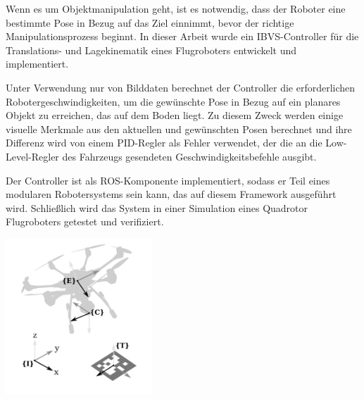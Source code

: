 
Wenn es um Objektmanipulation geht, ist es notwendig, dass der Roboter eine bestimmte Pose in Bezug auf das Ziel einnimmt, bevor der richtige Manipulationsprozess beginnt. In dieser Arbeit wurde ein IBVS-Controller für die Translations- und Lagekinematik eines Flugroboters entwickelt und implementiert.

Unter Verwendung nur von Bilddaten berechnet der Controller die erforderlichen Robotergeschwindigkeiten, um die gewünschte Pose in Bezug auf ein planares Objekt zu erreichen, das auf dem Boden liegt. Zu diesem Zweck werden einige visuelle Merkmale aus den aktuellen und gewünschten Posen berechnet und ihre Differenz wird von einem PID-Regler als Fehler verwendet, der die an die Low-Level-Regler des Fahrzeugs gesendeten Geschwindigkeitsbefehle ausgibt.

Der Controller ist als ROS-Komponente implementiert, sodass er Teil eines modularen Robotersystems sein kann, das auf diesem Framework ausgeführt wird. Schließlich wird das System in einer Simulation eines Quadrotor Flugroboters getestet und verifiziert.

\begin{center}
	\includegraphics[keepaspectratio, width=5.5cm]{content/frames_bw.png}
\end{center}
